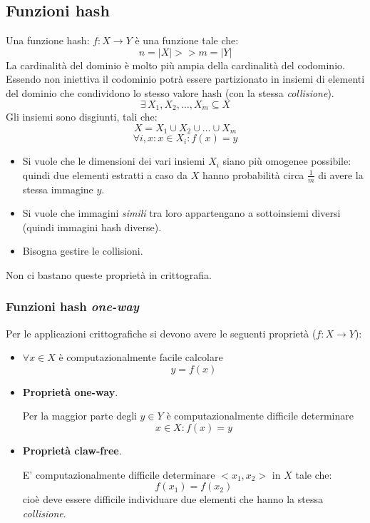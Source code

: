 \subsection{Funzioni hash}
Una funzione hash: $f: X \xrightarrow{} Y$ è una funzione tale che:
$$ n = |X| >> m = |Y| $$
La cardinalità del dominio è molto più ampia della cardinalità del codominio. Essendo non iniettiva il codominio potrà essere partizionato in insiemi di elementi del dominio che condividono lo stesso valore hash (con la stessa \emph{collisione}).
$$ \exists\, X_1, X_2, \dots, X_m \subseteq X$$
Gli insiemi sono disgiunti, tali che: 
$$ X = X_1 \cup X_2 \cup \dots \cup  X_m $$
$$ \forall i, x : x \in X_i : f(x) = y $$
\begin{itemize}
	\item Si vuole che le dimensioni dei vari insiemi $X_i$ siano più omogenee possibile: quindi due elementi estratti a caso da $X$ hanno probabilità circa $\frac{1}{m}$ di avere la stessa immagine $y$.
	\item Si vuole che immagini \emph{simili} tra loro appartengano a sottoinsiemi diversi (quindi immagini hash diverse).
	\item Bisogna gestire le collisioni.
\end{itemize}
Non ci bastano queste proprietà in crittografia. 
\subsubsection{Funzioni hash \emph{one-way}}
Per le applicazioni crittografiche si devono avere le seguenti proprietà ($f: X \xrightarrow{} Y$):
\begin{itemize}
    \item $\forall x \in X$ è computazionalmente facile calcolare $$y = f(x)$$
    \item \textbf{Proprietà one-way}. 
    
    Per la maggior parte degli $y \in Y$ è computazionalmente difficile determinare $$x \in X: f(x) = y$$
    \item \textbf{Proprietà {claw-free}}. 
    
    E' computazionalmente difficile determinare $<x_1, x_2>$ in $X$ tale che: $$f(x_1)=f(x_2)$$
    cioè deve essere difficile individuare due elementi che hanno la stessa \emph{collisione}.
\end{itemize}

